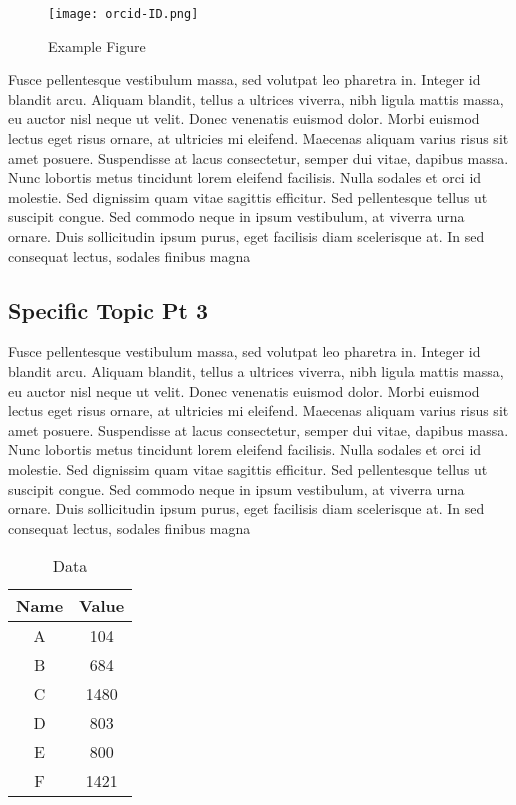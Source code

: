 \documentclass[linenumbers,RNAAS,trackchanges]{aastex631}
\begin{document}
\begin{figure}[H]
    \centering
    \texttt{[image: orcid-ID.png]}
    \caption{Example Figure}
    \label{fig:my_label}
\end{figure}

Fusce pellentesque vestibulum massa, sed volutpat leo pharetra in. Integer id blandit arcu. Aliquam blandit, tellus a ultrices viverra, nibh ligula mattis massa, eu auctor nisl neque ut velit. Donec venenatis euismod dolor. Morbi euismod lectus eget risus ornare, at ultricies mi eleifend. Maecenas aliquam varius risus sit amet posuere. Suspendisse at lacus consectetur, semper dui vitae, dapibus massa. Nunc lobortis metus tincidunt lorem eleifend facilisis. Nulla sodales et orci id molestie. Sed dignissim quam vitae sagittis efficitur. Sed pellentesque tellus ut suscipit congue. Sed commodo neque in ipsum vestibulum, at viverra urna ornare. Duis sollicitudin ipsum purus, eget facilisis diam scelerisque at. In sed consequat lectus, sodales finibus magna

\subsection{Specific Topic Pt 3} \label{sec:subtopic3}
Fusce pellentesque vestibulum massa, sed volutpat leo pharetra in. Integer id blandit arcu. Aliquam blandit, tellus a ultrices viverra, nibh ligula mattis massa, eu auctor nisl neque ut velit. Donec venenatis euismod dolor. Morbi euismod lectus eget risus ornare, at ultricies mi eleifend. Maecenas aliquam varius risus sit amet posuere. Suspendisse at lacus consectetur, semper dui vitae, dapibus massa. Nunc lobortis metus tincidunt lorem eleifend facilisis. Nulla sodales et orci id molestie. Sed dignissim quam vitae sagittis efficitur. Sed pellentesque tellus ut suscipit congue. Sed commodo neque in ipsum vestibulum, at viverra urna ornare. Duis sollicitudin ipsum purus, eget facilisis diam scelerisque at. In sed consequat lectus, sodales finibus magna

\begin{table}[H]
    \centering
    \begin{tabular}{|c|c|}
         \hline
         Name &  Value \\
         \hline
         A & 104 \\
         B & 684 \\
         C & 1480 \\
         D & 803 \\
         E & 800 \\
         F & 1421 \\
         \hline
    \end{tabular}
    \caption{Data}
    \label{tab:data_tab}
\end{table}
\end{document}
